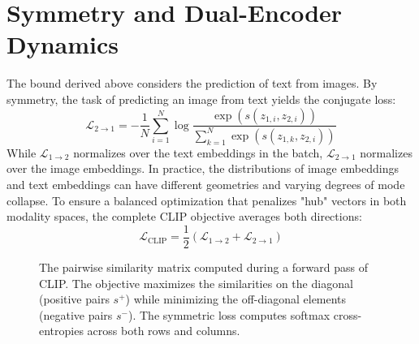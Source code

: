\section{Symmetry and Dual-Encoder Dynamics}

The bound derived above considers the prediction of text from images. By symmetry, the task of predicting an image from text yields the conjugate loss:
\begin{equation}
    \mathcal{L}_{2 \to 1} = - \frac{1}{N} \sum_{i=1}^N \log \frac{\exp(s(z_{1,i}, z_{2,i}))}{\sum_{k=1}^N \exp(s(z_{1,k}, z_{2,i}))}
\end{equation}
While $\mathcal{L}_{1 \to 2}$ normalizes over the text embeddings in the batch, $\mathcal{L}_{2 \to 1}$ normalizes over the image embeddings. In practice, the distributions of image embeddings and text embeddings can have different geometries and varying degrees of mode collapse. To ensure a balanced optimization that penalizes "hub" vectors in both modality spaces, the complete CLIP objective averages both directions:
\begin{equation}
    \mathcal{L}_{\text{CLIP}} = \frac{1}{2} \left( \mathcal{L}_{1 \to 2} + \mathcal{L}_{2 \to 1} \right)
\end{equation}

\begin{figure}[ht]
    \centering
    \caption{The pairwise similarity matrix computed during a forward pass of CLIP. The objective maximizes the similarities on the diagonal (positive pairs $s^+$) while minimizing the off-diagonal elements (negative pairs $s^-$). The symmetric loss computes softmax cross-entropies across both rows and columns.}
    \label{fig:clip_matrix}
\end{figure}

